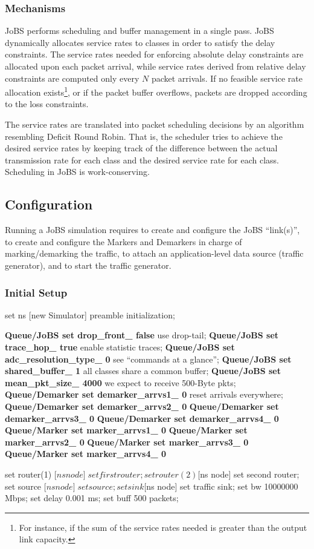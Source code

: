 \subsubsection{Mechanisms}
JoBS performs scheduling and buffer management in a 
single pass. JoBS dynamically allocates service rates to 
classes in order to satisfy the delay constraints. The service rates needed 
for enforcing absolute delay constraints 
are allocated upon each packet arrival, 
while service rates derived from 
relative delay constraints are computed only 
every $N$ packet arrivals. If no feasible 
service rate allocation exists\footnote{For instance, 
if the sum of the service 
rates needed is greater than the output link capacity.}, 
or if the packet buffer overflows, 
packets are dropped according to the loss constraints. 

The service rates are translated into packet scheduling decisions by 
an algorithm resembling Deficit Round Robin. That is, the scheduler 
tries to achieve the desired service rates by keeping track of the 
difference between the actual transmission rate for each class and the 
desired service rate for each class. Scheduling in JoBS is work-conserving.

\subsection{Configuration}
Running a JoBS simulation requires to create and configure the JoBS 
``link(s)'', to create and configure the Markers and Demarkers in charge 
of marking/demarking the traffic, to attach an application-level data 
source (traffic generator), and to start the traffic generator.

\subsubsection{Initial Setup}
\begin{program}
set ns [new Simulator] \; preamble initialization;

{\bfseries{}Queue/JoBS set drop_front_ false} \; use drop-tail;
{\bfseries{}Queue/JoBS set trace_hop_ true} \; enable statistic traces;
{\bfseries{}Queue/JoBS set adc_resolution_type_ 0} \; see ``commands at a glance'';
{\bfseries{}Queue/JoBS set shared_buffer_ 1} \; all classes share a common buffer;
{\bfseries{}Queue/JoBS set mean_pkt_size_ 4000}\; we expect to receive 500-Byte pkts;
{\bfseries{}Queue/Demarker set demarker_arrvs1_ 0}\; reset arrivals everywhere;
{\bfseries{}Queue/Demarker set demarker_arrvs2_ 0}
{\bfseries{}Queue/Demarker set demarker_arrvs3_ 0}
{\bfseries{}Queue/Demarker set demarker_arrvs4_ 0}
{\bfseries{}Queue/Marker set marker_arrvs1_ 0}
{\bfseries{}Queue/Marker set marker_arrvs2_ 0}
{\bfseries{}Queue/Marker set marker_arrvs3_ 0}
{\bfseries{}Queue/Marker set marker_arrvs4_ 0}

set router(1) [$ns node] \; set first router;
set router(2) [$ns node] \; set second router;
set source [$ns node] \; set source;
set sink [$ns node] \; set traffic sink;
set bw 10000000  Mbps;
set delay 0.001  ms;
set buff 500  packets;
\end{program}
